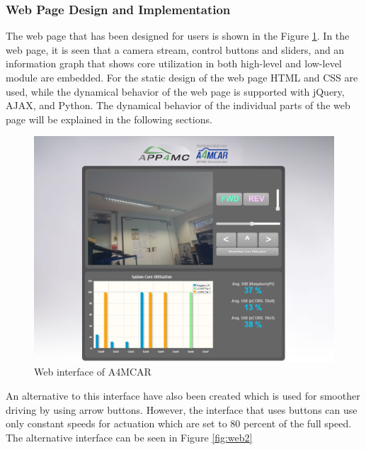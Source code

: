 \subsubsection{Web Page Design and Implementation} 
The web page that has been designed for users is shown in the Figure \ref{fig:web}. In the web page, it is seen that a camera stream, control buttons and sliders, and an information graph that shows core utilization in both high-level and low-level module are embedded. For the static design of the web page HTML and CSS are used, while the dynamical behavior of the web page is supported with jQuery, AJAX, and Python. The dynamical behavior of the individual parts of the web page will be explained in the following sections.
\begin{figure}[!ht]
	\centering
	\captionsetup{justification=centering}
	\includegraphics[width=\textwidth]{content/images/web.png}
	\caption{Web interface of A4MCAR}
	\label{fig:web}
\end{figure}

An alternative to this interface have also been created which is used for smoother driving by using arrow buttons. However, the interface that uses buttons can use only constant speeds for actuation which are set to 80 percent of the full speed. The alternative interface can be seen in Figure \ref{fig:web2}

